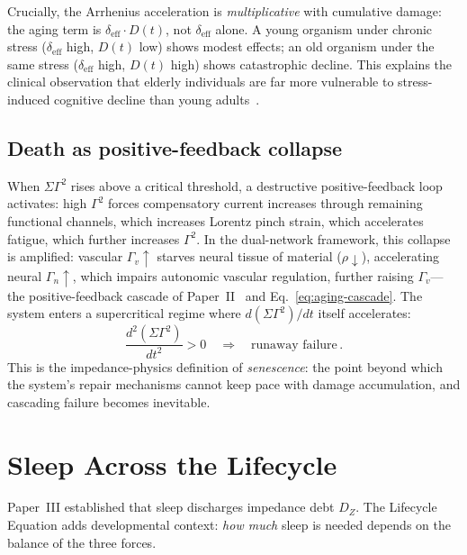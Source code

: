 ﻿\documentclass[aps,pre,twocolumn,superscriptaddress,floatfix]{revtex4-2}
\begin{document}
Crucially, the Arrhenius acceleration is
\emph{multiplicative} with cumulative damage:
the aging term is $\delta_{\mathrm{eff}} \cdot D(t)$,
not $\delta_{\mathrm{eff}}$ alone.
A young organism under chronic stress
($\delta_{\mathrm{eff}}$ high, $D(t)$ low)
shows modest effects;
an old organism under the same stress
($\delta_{\mathrm{eff}}$ high, $D(t)$ high)
shows catastrophic decline.
This explains the clinical observation that
elderly individuals are far more vulnerable
to stress-induced cognitive decline than
young adults~\cite{Lupien2009}.


\subsection{Death as positive-feedback collapse}

When $\Sigma\Gamma^2$ rises above a critical threshold,
a destructive positive-feedback loop activates:
high $\Gamma^2$ forces compensatory current increases
through remaining functional channels,
which increases Lorentz pinch strain,
which accelerates fatigue,
which further increases $\Gamma^2$.
In the dual-network framework, this collapse is amplified:
vascular $\Gamma_v\!\uparrow$ starves neural tissue of
material ($\rho\!\downarrow$), accelerating neural $\Gamma_n\!\uparrow$,
which impairs autonomic vascular regulation,
further raising $\Gamma_v$---the positive-feedback cascade
of Paper~II~\cite{PaperII} and Eq.~\eqref{eq:aging-cascade}.
The system enters a supercritical regime where
$d(\Sigma\Gamma^2)/dt$ itself accelerates:
\begin{equation}
  \frac{d^2(\Sigma\Gamma^2)}{dt^2} > 0
  \quad\Longrightarrow\quad
  \text{runaway failure}\,.
  \label{eq:runaway}
\end{equation}
This is the impedance-physics definition of
\emph{senescence}: the point beyond which
the system's repair mechanisms cannot keep pace
with damage accumulation, and cascading failure
becomes inevitable.


\section{Sleep Across the Lifecycle}
\label{sec:sleep-lifecycle}

Paper~III established that sleep discharges impedance
debt $D_Z$.
The Lifecycle Equation adds developmental context:
\emph{how much} sleep is needed depends on the balance
of the three forces.
\end{document}
